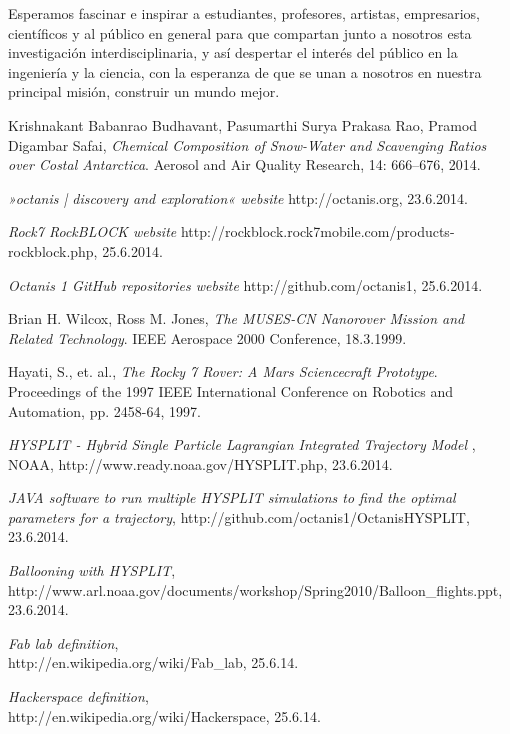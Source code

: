 \documentclass[a4paper,12pt]{article}
\begin{document}
Esperamos fascinar e inspirar a estudiantes, profesores, artistas, empresarios, científicos y al público en general para que compartan junto a nosotros esta investigación interdisciplinaria, y así despertar el interés del público en la ingeniería y la ciencia, con la esperanza de que se unan a nosotros en nuestra principal misión, construir un mundo mejor.


\pagebreak
\pagestyle{empty}
\begin{thebibliography}{14}


  Krishnakant Babanrao Budhavant, Pasumarthi Surya Prakasa Rao, Pramod Digambar Safai,
  \emph{Chemical Composition of Snow-Water and Scavenging Ratios over Costal Antarctica}.
  Aerosol and Air Quality Research, 14: 666–676, 2014.

{\em »octanis | discovery and exploration« website} http://octanis.org, 23.6.2014.

{\em Rock7 RockBLOCK website} http://rockblock.rock7mobile.com/products-rockblock.php, 25.6.2014.


{\em Octanis 1 GitHub repositories website} http://github.com/octanis1, 25.6.2014.

  Brian H. Wilcox, Ross M. Jones, 
  \emph{The MUSES-CN Nanorover Mission and Related Technology}.
  IEEE Aerospace 2000 Conference, 18.3.1999.


  Hayati, S., et. al., 
  \emph{The Rocky 7 Rover: A Mars Sciencecraft Prototype}.
  Proceedings of the 1997 IEEE International Conference on Robotics and Automation, pp. 2458-64, 1997.

  {\em HYSPLIT - Hybrid Single Particle Lagrangian Integrated Trajectory Model }, NOAA, http://www.ready.noaa.gov/HYSPLIT.php, 23.6.2014.

  {\em JAVA software to run multiple HYSPLIT simulations to find the optimal parameters for a trajectory}, http://github.com/octanis1/OctanisHYSPLIT, 23.6.2014.

	{\em Ballooning with HYSPLIT}, \\
	http://www.arl.noaa.gov/documents/workshop/Spring2010/Balloon\_flights.ppt, 23.6.2014.

	{\em Fab lab definition}, \\
	http://en.wikipedia.org/wiki/Fab\_lab, 25.6.14.

	{\em Hackerspace definition}, \\
	http://en.wikipedia.org/wiki/Hackerspace, 25.6.14.


\end{thebibliography}
\end{document}
